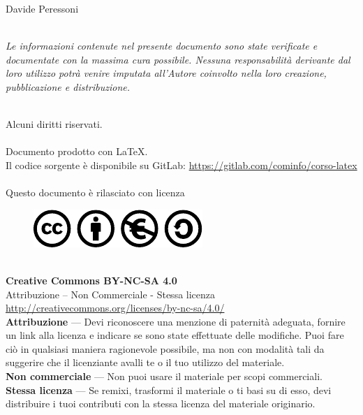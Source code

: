  Davide Peressoni\\~\par
    \emph{Le informazioni contenute nel presente documento sono state verificate e documentate con la massima cura possibile. Nessuna responsabilità derivante dal loro utilizzo potrà venire imputata all’Autore coinvolto nella loro creazione, pubblicazione e distribuzione.}\\~\par
    Alcuni diritti riservati.\\~\\
    Documento prodotto con \LaTeX.\\
    Il codice sorgente è disponibile su GitLab: \url{https://gitlab.com/cominfo/corso-latex}\\~\\
    Questo documento è rilasciato con licenza\\
    \begin{figure}[!ht]
	\centering
	    \includegraphics{CC.pdf}
    \end{figure}~\\
    \textbf{Creative Commons BY-NC-SA 4.0}\\
    Attribuzione – Non Commerciale - Stessa licenza\\
    \url{http://creativecommons.org/licenses/by-nc-sa/4.0/}\\
    \textbf{Attribuzione} — Devi riconoscere una menzione di paternità adeguata, fornire un link alla licenza e indicare se sono state effettuate delle modifiche. Puoi
    fare ciò in qualsiasi maniera ragionevole possibile, ma non con modalità tali da suggerire che il licenziante avalli te o il tuo utilizzo del materiale.\\
    \textbf{Non commerciale} — Non puoi usare il materiale per scopi commerciali.\\
    \textbf{Stessa licenza} — Se remixi, trasformi il materiale o ti basi su di esso, devi distribuire i tuoi contributi con la stessa licenza del materiale originario.
